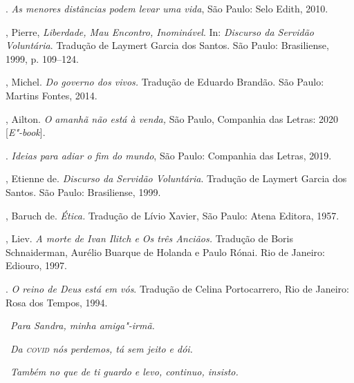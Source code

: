 \pagebreak
\begin{bibliohedra}
. \emph{As menores distâncias podem levar uma vida}, São Paulo:
Selo Edith, 2010.

, Pierre, \emph{Liberdade, Mau Encontro, Inominável}. In:
\emph{Discurso da Servidão Voluntária}. Tradução de Laymert Garcia dos
Santos. São Paulo: Brasiliense, 1999, p. 109--124.

, Michel. \emph{Do governo dos vivos.} Tradução de Eduardo
Brandão. São Paulo: Martins Fontes, 2014.

, Ailton. \emph{O amanhã não está à venda,} São Paulo, Companhia
das Letras: 2020 {[}\emph{E"-book}{]}.

\titidem. \emph{Ideias para adiar o fim do mundo}, São Paulo: Companhia
das Letras, 2019.

, Etienne de. \emph{Discurso da Servidão Voluntária}. Tradução
de Laymert Garcia dos Santos. São Paulo: Brasiliense, 1999.

, Baruch de. \emph{Ética.} Tradução de Lívio Xavier, São Paulo:
Atena Editora, 1957.

, Liev. \emph{A morte de Ivan Ilitch e Os três Anciãos.} Tradução
de Boris Schnaiderman, Aurélio Buarque de Holanda e Paulo Rónai. Rio de
Janeiro: Ediouro, 1997.

\titidem. \emph{O reino de Deus está em vós}. Tradução de Celina
Portocarrero, Rio de Janeiro: Rosa dos Tempos, 1994.
\end{bibliohedra}


\hfill\ \emph{Para Sandra, minha amiga"-irmã.}

\hfill\ \emph{Da \textsc{covid} nós perdemos, tá sem jeito e dói.}

\hfill\ \emph{Também no que de ti guardo e levo, continuo, insisto.}

\bigskip

